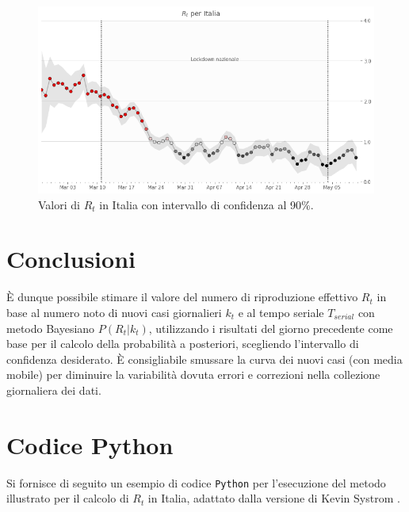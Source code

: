 \documentclass[11pt]{article}
\begin{document}
    
    
    \begin{figure}
    \centering
        \includegraphics{rtitalia.png}
        \caption{Valori di $R_t$ in Italia con intervallo di confidenza al 90\%.}
        \label{fig:rtitalia}
    \end{figure}

    
    \hypertarget{conclusioni}{%
\section{Conclusioni}\label{conclusioni}}

    È dunque possibile stimare il valore del numero di riproduzione
effettivo \(R_t\) in base al numero noto di nuovi casi giornalieri
\(k_t\) e al tempo seriale \(T_{serial}\) con metodo Bayesiano
\(P(R_t|k_t)\), utilizzando i risultati del giorno precedente come base
per il calcolo della probabilità a posteriori, scegliendo l'intervallo
di confidenza desiderato. È consigliabile smussare la curva dei nuovi
casi (con media mobile) per diminuire la variabilità dovuta errori e
correzioni nella collezione giornaliera dei dati.

    \hypertarget{codice-python}{%
\section{Codice Python}\label{codice-python}}

    Si fornisce di seguito un esempio di codice \texttt{Python} per
l'esecuzione del metodo illustrato per il calcolo di \(R_t\) in Italia,
adattato dalla versione di Kevin Systrom \cite{k-sys}.
\end{document}
